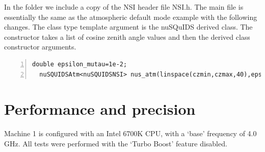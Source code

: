 \documentclass[3p,12pt]{elsarticle}
\newcommand{\ttf}{\ttfamily}
\begin{document}
In the folder we include a copy of the NSI header file {\ttf NSI.h}.
The main file is essentially the same as the atmospheric default mode
example with the following changes.
The class type template argument is the nuSQuIDS derived class. The
constructor takes a list of cosine zenith angle values and then the
derived class constructor arguments. 

\begin{lstlisting}[frame=leftline, numbers =
  left,breaklines=true,label = ex:sin1,firstnumber=last]
  double epsilon_mutau=1e-2;
  nuSQUIDSAtm<nuSQUIDSNSI> nus_atm(linspace(czmin,czmax,40),epsilon_mutau,logspace(Emin,Emax,100),numneu,both,true);
\end{lstlisting}

\section{Performance and precision}
\label{sec:performance} 

Machine 1 is configured with an Intel 6700K CPU, with a `base' frequency of 4.0 GHz. All tests were performed with the `Turbo Boost' feature disabled. 
\end{document}
